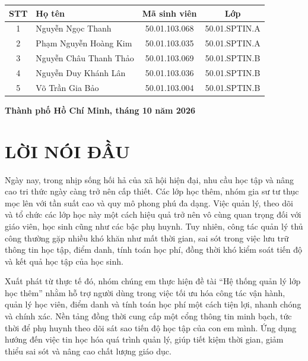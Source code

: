 \documentclass[12pt,a4paper]{report}
\begin{document}
\begin{titlepage}
\begin{center}
        \begin{center}
        \begin{tabular}{|c|p{5cm}|c|c|}
            \hline
            \textbf{STT} & \textbf{Họ tên} & \textbf{Mã sinh viên} & \textbf{Lớp} \\ \hline
            1 & Nguyễn Ngọc Thanh & 50.01.103.068 & 50.01.SPTIN.A \\ \hline
            2 & Phạm Nguyễn Hoàng Kim & 50.01.103.035 & 50.01.SPTIN.A \\ \hline
            3 & Nguyễn Châu Thanh Thảo & 50.01.103.069 & 50.01.SPTIN.B \\ \hline
            4 & Nguyễn Duy Khánh Lân & 50.01.103.036 & 50.01.SPTIN.B \\ \hline
            5 & Võ Trần Gia Bảo & 50.01.103.004 & 50.01.SPTIN.B \\ 
            \hline
        \end{tabular}
        \end{center}
        
        \vfill
        \textbf{Thành phố Hồ Chí Minh, tháng 10 năm 2026}
    \end{center}
\end{titlepage}


\tableofcontents
\newpage

\chapter*{LỜI NÓI ĐẦU}
Ngày nay, trong nhịp sống hối hả của xã hội hiện đại, nhu cầu học tập và nâng cao tri thức ngày càng trở nên cấp thiết. Các lớp học thêm, nhóm gia sư tư thục mọc lên với tần suất cao và quy mô phong phú đa dạng. Việc quản lý, theo dõi và tổ chức các lớp học này một cách hiệu quả trở nên vô cùng quan trọng đối với giáo viên, học sinh cũng như các bậc phụ huynh. Tuy nhiên, công tác quản lý thủ công thường gặp nhiều khó khăn như mất thời gian, sai sót trong việc lưu trữ thông tin học tập, điểm danh, tính toán học phí, đồng thời khó kiểm soát tiến độ và kết quả học tập của học sinh.

Xuất phát từ thực tế đó, nhóm chúng em thực hiện đề tài ``Hệ thống quản lý lớp học thêm'' nhằm hỗ trợ người dùng trong việc tối ưu hóa công tác vận hành, quản lý học viên, điểm danh và tính toán học phí một cách tiện lợi, nhanh chóng và chính xác. Nền tảng đồng thời cung cấp một cổng thông tin minh bạch, tức thời để phụ huynh theo dõi sát sao tiến độ học tập của con em mình. Ứng dụng hướng đến việc tin học hóa quá trình quản lý, giúp tiết kiệm thời gian, giảm thiểu sai sót và nâng cao chất lượng giáo dục.
\end{document}
